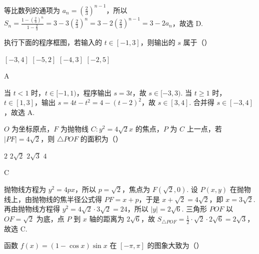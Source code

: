 \begin{solution}
等比数列的通项为 \(a_n=\left(\frac{2}{3}\right)^{n-1}\)，所以
\(\displaystyle S_n=\frac{1-\left(\frac{2}{3}\right)^n}{1-\frac{2}{3}}=3-3\left(\frac{2}{3}\right)^n=3-2\left(\frac{2}{3}\right)^{n-1}=3-2a_n\)，故选 D.
\end{solution}

\begin{problem}
执行下面的程序框图，若输入的 \(t \in [-1,3]\)，则输出的 \(s\) 属于（\quad）


\choices
    {\([-3, 4]\)}
    {\([-5, 2]\)}
    {\([-4,3]\)}
    {\([-2,5]\)}
\end{problem}

\begin{answer}
A
\end{answer}

\begin{solution}
当 \(t<1\) 时，\(t\in[-1,1)\)，程序输出 \(s=3t\)，故 \(s\in[-3,3)\). 当 \(t\geqslant1\) 时，\(t\in[1,3]\)，输出 \(s=4t-t^2=4-(t-2)^2\)，故 \(s\in[3,4]\). 合并得 \(s\in[-3,4]\)，故选 A.
\end{solution}

\begin{problem}
\(O\) 为坐标原点，\(F\) 为抛物线 \(C: y^{2} = 4\sqrt{2} x\) 的焦点，\(P\) 为 \(C\) 上一点，若 \(|PF| = 4\sqrt{2}\)，则 \(\triangle POF\) 的面积为（\quad）

\choices
    {\(2\)}
    {\(2\sqrt{2}\)}
    {\(2\sqrt{3}\)}
    {\(4\)}
\end{problem}

\begin{answer}
C
\end{answer}

\begin{solution}
抛物线方程为 \(y^2=4px\)，所以 \(p=\sqrt{2}\)，焦点为 \(F(\sqrt{2},0)\). 设 \(P(x,y)\) 在抛物线上，由抛物线的焦半径公式得 \(PF=x+p\)，于是 \(x+\sqrt{2}=4\sqrt{2}\)，即 \(x=3\sqrt{2}\). 再由抛物线方程得 \(y^2=4\sqrt{2}\cdot3\sqrt{2}=24\)，所以 \(|y|=2\sqrt{6}\). 三角形 \(POF\) 以 \(OF=\sqrt{2}\) 为底，点 \(P\) 到 \(x\) 轴的距离为 \(2\sqrt{6}\)，故
\(\displaystyle S_{\triangle POF}=\frac{1}{2}\cdot\sqrt{2}\cdot2\sqrt{6}=2\sqrt{3}\)，故选 C.
\end{solution}

\begin{problem}
函数 \(f(x) = (1 - \cos x)\sin x\) 在 \(\left[-\pi,\pi\right]\) 的图象大致为（\quad）

    {}
    {}
    {}
\end{problem}

